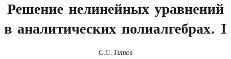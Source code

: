 









\newcommand{\const}{\operatorname{const}}


\newcommand{\tts}[1]{}







\setcounter{page}{66}















\author{\it С.С.\,Титов}




\title{Решение нелинейных уравнений \\


в аналитических полиалгебрах. I}





\date{}




\pagestyle{plain} %







\maketitle


